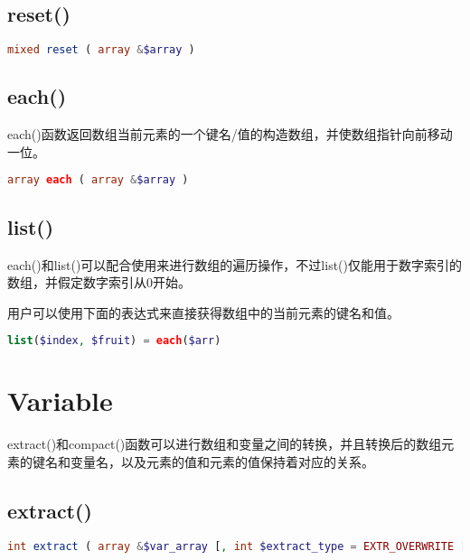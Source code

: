 \subsection{reset()}



\begin{lstlisting}[language=PHP]
mixed reset ( array &$array )
\end{lstlisting}


\subsection{each()}

each()函数返回数组当前元素的一个键名/值的构造数组，并使数组指针向前移动一位。

\begin{lstlisting}[language=PHP]
array each ( array &$array )
\end{lstlisting}


\subsection{list()}

each()和list()可以配合使用来进行数组的遍历操作，不过list()仅能用于数字索引的数组，并假定数字索引从0开始。

用户可以使用下面的表达式来直接获得数组中的当前元素的键名和值。


\begin{lstlisting}[language=PHP]
list($index, $fruit) = each($arr)
\end{lstlisting}

\section{Variable}


extract()和compact()函数可以进行数组和变量之间的转换，并且转换后的数组元素的键名和变量名，以及元素的值和元素的值保持着对应的关系。


\subsection{extract()}





\begin{lstlisting}[language=PHP]
int extract ( array &$var_array [, int $extract_type = EXTR_OVERWRITE [, string $prefix = NULL ]] )
\end{lstlisting}

